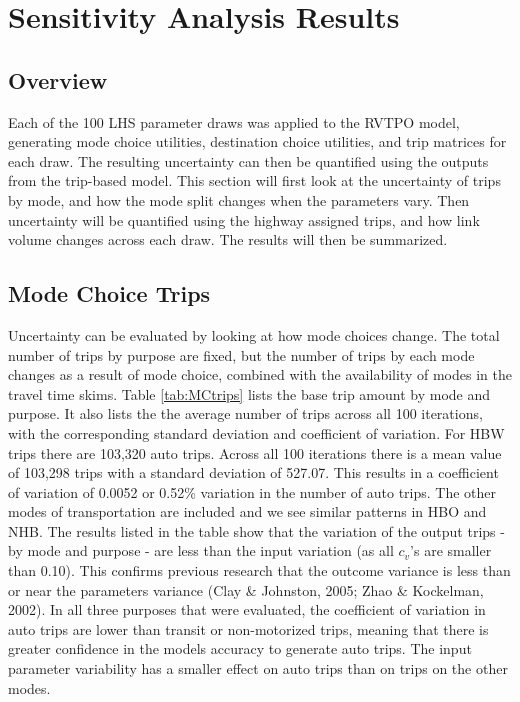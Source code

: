 \documentclass[fancy, masters,twoside]{byuthesis}
\begin{document}
\hypertarget{sensitivity-analysis-results}{%
\chapter{Sensitivity Analysis Results}\label{sensitivity-analysis-results}}

\hypertarget{overview-1}{%
\section{Overview}\label{overview-1}}

Each of the 100 LHS parameter draws was applied to the RVTPO model, generating mode choice utilities, destination choice utilities, and trip matrices for each draw. The resulting uncertainty can then be quantified using the outputs from the trip-based model. This section will first look at the uncertainty of trips by mode, and how the mode split changes when the parameters vary. Then uncertainty will be quantified using the highway assigned trips, and how link volume changes across each draw. The results will then be summarized.

\hypertarget{mode-choice-trips}{%
\section{Mode Choice Trips}\label{mode-choice-trips}}

Uncertainty can be evaluated by looking at how mode choices change. The total number of trips by purpose are fixed, but the number of trips by each mode changes as a result of mode choice, combined with the availability of modes in the travel time skims. Table \ref{tab:MCtrips} lists the base trip amount by mode and purpose. It also lists the the average number of trips across all 100 iterations, with the corresponding standard deviation and coefficient of variation. For HBW trips there are 103,320 auto trips. Across all 100 iterations there is a mean value of 103,298 trips with a standard deviation of 527.07. This results in a coefficient of variation of 0.0052 or 0.52\% variation in the number of auto trips. The other modes of transportation are included and we see similar patterns in HBO and NHB. The results listed in the table show that the variation of the output trips - by mode and purpose - are less than the input variation (as all \(c_v\)'s are smaller than 0.10). This confirms previous research that the outcome variance is less than or near the parameters variance (Clay \& Johnston, 2005; Zhao \& Kockelman, 2002). In all three purposes that were evaluated, the coefficient of variation in auto trips are lower than transit or non-motorized trips, meaning that there is greater confidence in the models accuracy to generate auto trips. The input parameter variability has a smaller effect on auto trips than on trips on the other modes.
\end{document}
